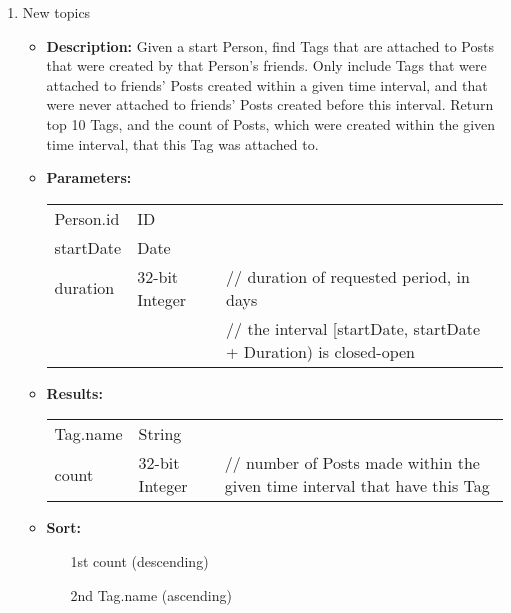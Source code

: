 {\begin{enumerate}
        \item New topics
            \begin{itemize}
                \item \textbf{Description:}
                    Given a start Person, find Tags that are attached to Posts that
                    were created by that Person's friends.  Only include Tags that were
                    attached to friends' Posts created within a given time interval, and that
                    were never attached to friends' Posts created before this interval.  Return
                    top 10 Tags, and the count of Posts, which were created within the
                    given time interval, that this Tag was attached to.
                \item \textbf{Parameters:} \\
                    \begin{tabular}{lll}
                        Person.id 										& ID 	& \\
                        startDate 										& Date & \\
                        duration										& 32-bit Integer 					& // duration of requested period, in days \\
                                          &                                   & // the interval [startDate, startDate + Duration) is closed-open\\
                    \end{tabular} 
                \item \textbf{Results:} \\
                    \begin{tabular}{lll}
                        Tag.name 										& String 	& \\
                        count 											& 32-bit Integer & // number of Posts made within the given time interval that have this Tag \\
                    \end{tabular}		
                \item \textbf{Sort:}
                  \begin{itemize}
                    \item[1st] count (descending)
                    \item[2nd] Tag.name (ascending)
                  \end{itemize}
            \end{itemize}


\end{enumerate}}
